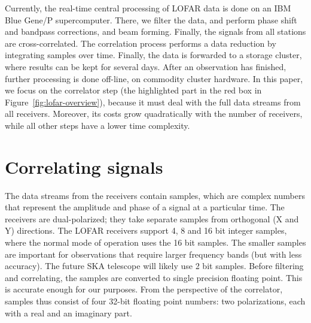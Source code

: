 \documentclass{article}
\begin{document}
Currently, the real-time central processing of LOFAR data is done on
an IBM Blue Gene/P supercomputer.  There, we filter the data, and
perform phase shift and bandpass corrections, and beam forming.
Finally, the signals from all stations are cross-correlated.  The
correlation process performs a data reduction by integrating samples
over time.  Finally, the data is forwarded to a storage cluster, where
results can be kept for several days.  After an observation has
finished, further processing is done off-line, on commodity cluster
hardware.  In this paper, we focus on the correlator step (the
highlighted part in the red box in
Figure~\ref{fig:lofar-overview}), because it must deal with the
full data streams from all receivers. Moreover, its costs grow
quadratically with the number of receivers, while all other steps have
a lower time complexity.


\section{Correlating signals}







The data streams from the receivers contain samples, which are complex
numbers that represent the amplitude and phase of a signal at a
particular time.  The receivers are dual-polarized; they take separate
samples from orthogonal (X and Y) directions.  The LOFAR receivers
support 4, 8 and 16 bit integer samples, where the normal mode of
operation uses the 16 bit samples. The smaller samples are important
for observations that require larger frequency bands (but with less accuracy).
The future SKA telescope will
likely use 2 bit samples.  Before filtering and correlating, the
samples are converted to single precision floating point.  This is
accurate enough for our purposes. From the perspective of the
correlator, samples thus consist of four 32-bit floating point
numbers: two polarizations, each with a real and an imaginary part.
\end{document}
